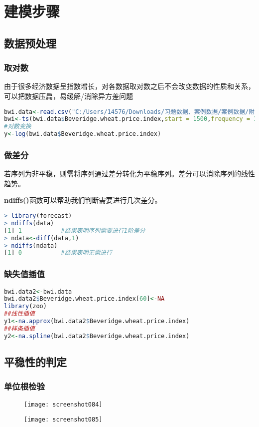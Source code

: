 \documentclass[11pt,a4paper,oneside]{book}
\begin{document}
\section{建模步骤}
\subsection{数据预处理}
\subsubsection{取对数}
由于很多经济数据呈指数增长，对各数据取对数之后不会改变数据的性质和关系，可以把数据压扁，易缓解/消除异方差问题

\begin{lstlisting}[language=r]
bwi.data<-read.csv("C:/Users/14576/Downloads/习题数据、案例数据/案例数据/附录1.6.csv")
bwi<-ts(bwi.data$Beveridge.wheat.price.index,start = 1500,frequency = 1)
#对数变换
y<-log(bwi.data$Beveridge.wheat.price.index)
\end{lstlisting}
\subsubsection{做差分}
若序列为非平稳，则需将序列通过差分转化为平稳序列。差分可以消除序列的线性趋势。

\textbf{ndiffs()}函数可以帮助我们判断需要进行几次差分。
\begin{lstlisting}[language=r]
> library(forecast)
> ndiffs(data)
[1] 1           #结果表明序列需要进行1阶差分
> ndata<-diff(data,1)
> ndiffs(ndata)
[1] 0           #结果表明无需进行 
\end{lstlisting}
\subsubsection{缺失值插值}
\begin{lstlisting}[language=r]
bwi.data2<-bwi.data
bwi.data2$Beveridge.wheat.price.index[60]<-NA
library(zoo)
##线性插值
y1<-na.approx(bwi.data2$Beveridge.wheat.price.index)
##样条插值
y2<-na.spline(bwi.data2$Beveridge.wheat.price.index)
\end{lstlisting}
\subsection{平稳性的判定}
\subsubsection{单位根检验}
\begin{figure}[H]
	\centering
	\texttt{[image: screenshot084]}
	\label{fig:screenshot084}
\end{figure}
\begin{figure}[H]
	\centering
	\texttt{[image: screenshot085]}
	\label{fig:screenshot085}
\end{figure}
\end{document}
